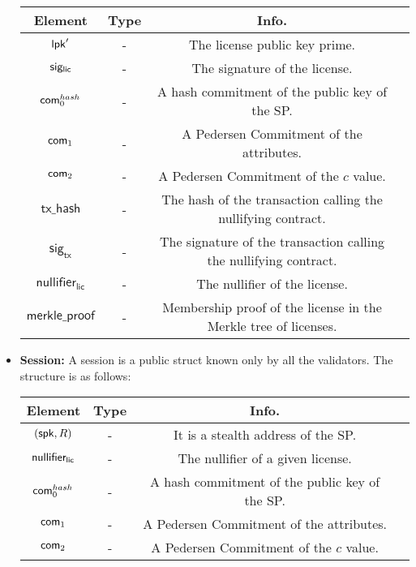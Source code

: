 \begin{itemize}
    \begin{center}
        \begin{tabular}{ |c|c|c|c| } 
        \hline
        \textbf{Element} & \textbf{Type} & \textbf{Info.} \\
        \hline
        $\mathsf{lpk}'$ & - & The license public key prime.\\ 
        $\mathsf{sig_{lic}}$ & - & The signature of the license. \\ 
        $\mathsf{com}_0^{hash}$ & - & A hash commitment of the public key of the SP. \\ 
        $\mathsf{com}_1$ & - & A Pedersen Commitment of the attributes. \\ 
        $\mathsf{com}_2$ & - & A Pedersen Commitment of the $c$ value. \\ 
        $\mathsf{tx\_hash}$ & - & The hash of the transaction calling the nullifying contract. \\ 
        $\mathsf{sig}_\mathsf{tx}$ & - & The signature of the transaction calling the nullifying contract. \\ 
        $\mathsf{nullifier}_\mathsf{lic}$ & - & The nullifier of the license. \\ 
        $\mathsf{merkle\_proof}$ & - & Membership proof of the license in the Merkle tree of licenses. \\ 

        \hline
        \end{tabular}
    \end{center}

    \item \textbf{Session:} A session is a public struct known only by all the validators. The structure is as follows:

    \begin{center}
        \begin{tabular}{ |c|c|c|c| } 
        \hline
        \textbf{Element} & \textbf{Type} & \textbf{Info.} \\
        \hline
        $(\mathsf{spk}, R)$ & - & It is a stealth address of the SP. \\ 
        $\mathsf{nullifier_{lic}}$ & - & The nullifier of a given license. \\ 
        $\mathsf{com}_0^{hash}$ & - & A hash commitment of the public key of the SP. \\ 
        $\mathsf{com}_1$ & - & A Pedersen Commitment of the attributes. \\ 
        $\mathsf{com}_2$ & - & A Pedersen Commitment of the $c$ value. \\ 
        \hline
        \end{tabular}
    \end{center}


\end{itemize}

